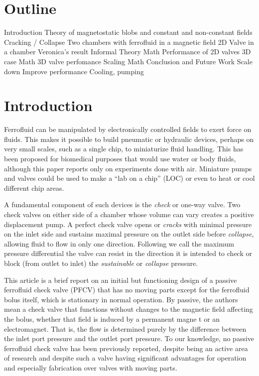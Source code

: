 \documentclass{asme2ej}
\begin{document}
\section{Outline}


\begin{outline}[enumerate]
  \1 Introduction
  \1 Theory of magnetostatic blobs and constant and non-constant fields
     \2 Cracking / Collapse
     \2 Two chambers with ferrofluid in a magnetic field
  \1 2D Valve in a chamber
      \2 Veronica's result
      \2 Informal Theory
      \2 Math
      \2 Performance of 2D valves
  \1 3D case
      \2 Math
      \2 3D valve perfomance
  \1 Scaling
       \2 Math
  \1 Conclusion and Future Work
       \2 Scale down
       \2 Improve performance
       \2 Cooling, pumping
\end{outline}



\section{Introduction}

Ferrofluid can be manipulated by electronically controlled
fields to exert force on fluids\cite{torres2014recent,kole2021engineering,ozbey2015modeling}.
This makes it possible to build pneumatic or hydraulic
devices, perhaps on very small scales,
such as a single chip\cite{yamahata2003ferrofluid,hatch2001ferrofluidic}, to
miniaturize fluid handling.
This has been proposed for biomedical purposes\cite{michelson2019novel}
that would use water or body fluids,
although this paper reports only on experiments done with air.
Miniature pumps and valves could be used to make a “lab on a chip” (LOC) or
even to heat or cool different chip areas.

A fundamental component of such
devices is the {\em check} or one-way valve.
Two check
valves on either side of a chamber whose volume can vary creates a
positive displacement pump.
A perfect check valve opens or
{\em cracks} with minimal pressure on the inlet side and sustains maximal
pressure on the outlet side before {\em collapse},
allowing fluid to flow in only one
direction. Following\cite{hartshorne2004ferrofluid} we call the maximum pressure
differential the valve can resist in the direction it is intended to
check or block (from outlet to inlet) the {\em sustainable} or {\em collapse} pressure.

This article is a brief report on an initial but functioning design of a
passive ferrofluid check valve (PFCV) that has no moving
parts except for the ferrofluid bolus itself, which is stationary
in normal operation.
By passive, the authors
mean a check valve that functions without changes to the magnetic
field affecting the bolus, whether that field is induced by a
permanent magne t or an electromagnet.
That is, the flow is determined
purely by the difference between the inlet port pressure and the
outlet port pressure.
To our knowledge, no passive
ferrofluid check valve has been previously reported, despite being an
active area of research and despite such a valve having
significant advantages for operation and especially
fabrication over valves with moving parts.
\end{document}
